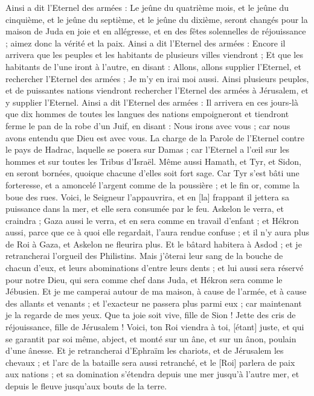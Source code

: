 \begin{multicols}{2}
Ainsi a dit l'Eternel des armées : Le jeûne du quatrième mois, et le jeûne du cinquième, et le jeûne du septième, et le jeûne du dixième, seront changés pour la maison de Juda en joie et en allégresse, et en des fêtes solennelles de réjouissance ; aimez donc la vérité et la paix.
Ainsi a dit l'Eternel des armées : Encore il arrivera que les peuples et les habitants de plusieurs villes viendront ;
Et que les habitants de l'une iront à l'autre, en disant : Allons, allons supplier l'Eternel, et rechercher l'Eternel des armées ; Je m'y en irai moi aussi.
Ainsi plusieurs peuples, et de puissantes nations viendront rechercher l'Eternel des armées à Jérusalem, et y supplier l'Eternel.
Ainsi a dit l'Eternel des armées : Il arrivera en ces jours-là que dix hommes de toutes les langues des nations empoigneront et tiendront ferme le pan de la robe d'un Juif, en disant : Nous irons avec vous ; car nous avons entendu que Dieu est avec vous.
\VerseOne{}La charge de la Parole de l'Eternel contre le pays de Hadrac, laquelle se posera sur Damas ; car l'Eternel a l'œil sur les hommes et sur toutes les Tribus d'Israël.
Même aussi Hamath, et Tyr, et Sidon, en seront bornées, quoique chacune d'elles soit fort sage.
Car Tyr s'est bâti une forteresse, et a amoncelé l'argent comme de la poussière ; et le fin or, comme la boue des rues.
Voici, le Seigneur l'appauvrira, et en [la] frappant il jettera sa puissance dans la mer, et elle sera consumée par le feu.
Askelon le verra, et craindra ; Gaza aussi le verra, et en sera comme en travail d'enfant ; et Hékron aussi, parce que ce à quoi elle regardait, l'aura rendue confuse ; et il n'y aura plus de Roi à Gaza, et Askelon ne fleurira plus.
Et le bâtard habitera à Asdod ; et je retrancherai l'orgueil des Philistins.
Mais j'ôterai leur sang de la bouche de chacun d'eux, et leurs abominations d'entre leurs dents ; et lui aussi sera réservé pour notre Dieu, qui sera comme chef dans Juda, et Hékron sera comme le Jébusien.
Et je me camperai autour de ma maison, à cause de l'armée, et à cause des allants et venants ; et l'exacteur ne passera plus parmi eux ; car maintenant je la regarde de mes yeux.
Que ta joie soit vive, fille de Sion ! Jette des cris de réjouissance, fille de Jérusalem ! Voici, ton Roi viendra à toi, [étant] juste, et qui se garantit par soi même, abject, et monté sur un âne, et sur un ânon, poulain d'une ânesse.
Et je retrancherai d'Ephraïm les chariots, et de Jérusalem les chevaux ; et l'arc de la bataille sera aussi retranché, et le [Roi] parlera de paix aux nations ; et sa domination s'étendra depuis une mer jusqu'à l'autre mer, et depuis le fleuve jusqu'aux bouts de la terre.

\end{multicols}

